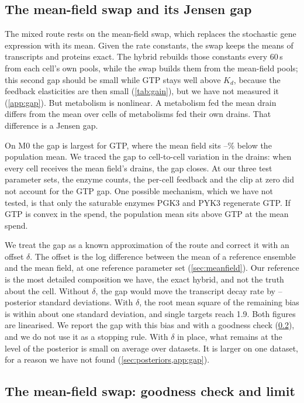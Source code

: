 \subsection{The mean-field swap and its Jensen gap}
\label{sec:jensen}

The mixed route rests on the mean-field swap, which replaces the stochastic gene
expression with its mean. Given the rate constants, the swap keeps the means of transcripts and
proteins exact. The hybrid rebuilds those constants every 60\,s from each cell's own pools, while
the swap builds them from the mean-field pools; this second gap should be small while GTP stays
well above $K_d$, because the feedback elasticities are then small (\cref{tab:gain}), but
we have not measured it (\cref{app:gap}). But metabolism is nonlinear. A metabolism fed the mean drain differs from the mean over
cells of metabolisms fed their own drains. That difference is a Jensen gap.

On M0 the gap is largest for GTP, where the mean field sits
--\% below the population mean. We traced the gap to
cell-to-cell variation in the drains: when every cell receives the mean field's drains,
the gap closes. At our three test parameter sets, the enzyme counts, the per-cell
feedback and the clip at zero did not account for the GTP gap. One possible mechanism,
which we have not tested, is that only the saturable enzymes PGK3 and PYK3 regenerate
GTP. If GTP is convex in the spend, the population mean sits above GTP at the mean
spend.

We treat the gap as a known approximation of the route and correct it with an offset $\delta$. The
offset is the log difference between the mean of a reference ensemble and the mean
field, at one reference parameter set (\cref{sec:meanfield}). Our reference is the most
detailed composition we have, the exact hybrid, and not the truth about the cell.
Without $\delta$, the gap would move the transcript decay rate by
-- posterior standard deviations. With $\delta$, the root
mean square of the remaining bias is within about one standard deviation, and single
targets reach 1.9. Both figures are linearised. We report the gap with this bias and
with a goodness check (\cref{app:swap}), and we do not use it as a stopping rule. With
$\delta$ in place, what remains at the level of the posterior is small on average over
datasets. It is larger on one dataset, for a reason we have not found
(\cref{sec:posteriors,app:gap}).

\subsection{The mean-field swap: goodness check and limit}
\label{app:swap}

